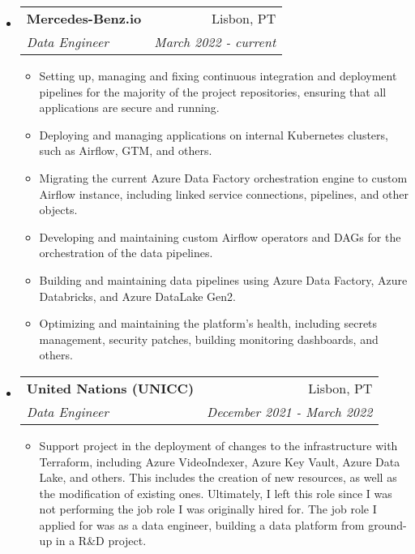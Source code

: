 \documentclass[letterpaper,11pt]{article} \newlength{\outerbordwidth} \pagestyle{empty}
\makeatletter
\newcommand{\resitem}[1]{\item #1 \vspace{-2pt}}
\newcommand{\ressubheading}[4]{
\begin{tabular*}{6.5in}{l@{\cftdotfill{\cftsecdotsep}\extracolsep{\fill}}r}
		\textbf{#1} & #2 \\
		\textit{#3} & \textit{#4} \\
\end{tabular*}\vspace{-6pt}}
\makeatother
\begin{document}
\begin{itemize}

\item
	\ressubheading{Mercedes-Benz.io}{Lisbon, PT}{Data Engineer}{March 2022 - current}
	\begin{itemize}
      \resitem{Setting up, managing and fixing continuous integration and deployment pipelines for the majority of the project repositories, ensuring that all applications are secure and running.}
      \resitem{Deploying and managing applications on internal Kubernetes clusters, such as Airflow, GTM, and others.}
      \resitem{Migrating the current Azure Data Factory orchestration engine to custom Airflow instance, including linked service connections, pipelines, and other objects.}
      \resitem{Developing and maintaining custom Airflow operators and DAGs for the orchestration of the data pipelines.}
      \resitem{Building and maintaining data pipelines using Azure Data Factory, Azure Databricks, and Azure DataLake Gen2.}
      \resitem{Optimizing and maintaining the platform's health, including secrets management, security patches, building monitoring dashboards, and others.}
	\end{itemize}

\item
    \ressubheading{United Nations (UNICC)}{Lisbon, PT}{Data Engineer}{December 2021 - March 2022}
	\begin{itemize}
            \resitem{Support project in the deployment of changes to the infrastructure with Terraform, including Azure VideoIndexer, Azure Key Vault, Azure Data Lake, and others. This includes the creation of new resources, as well as the modification of existing ones. Ultimately, I left this role since I was not performing the job role I was originally hired for. The job role I applied for was as a data engineer, building a data platform from ground-up in a R\&D project.}
	\end{itemize}


\end{itemize}
\end{document}
